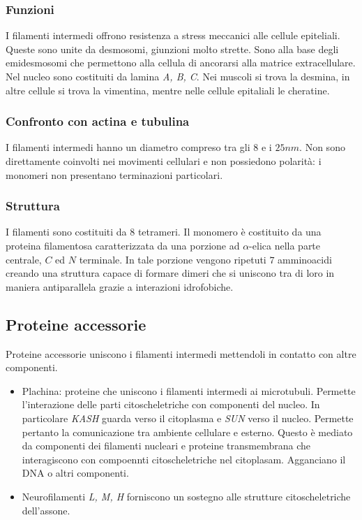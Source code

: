 		\subsubsection{Funzioni}
		I filamenti intermedi offrono resistenza a stress meccanici alle cellule epiteliali.
		Queste sono unite da desmosomi, giunzioni molto strette.
		Sono alla base degli emidesmosomi che permettono alla cellula di ancorarsi alla matrice extracellulare.
		Nel nucleo sono costituiti da lamina \emph{A, B, C}.
		Nei muscoli si trova la desmina, in altre cellule si trova la vimentina, mentre nelle cellule epitaliali le cheratine.

		\subsubsection{Confronto con actina e tubulina}
		I filamenti intermedi hanno un diametro compreso tra gli $8$ e i $25nm$.
		Non sono direttamente coinvolti nei movimenti cellulari e non possiedono polarit\`a: i monomeri non presentano terminazioni particolari.

		\subsubsection{Struttura}
		I filamenti sono costituiti da $8$ tetrameri.
		Il monomero \`e costituito da una proteina filamentosa caratterizzata da una porzione ad $\alpha$-elica nella parte centrale, $C$ ed $N$ terminale.
		In tale porzione vengono ripetuti $7$ amminoacidi creando una struttura capace di formare dimeri che si uniscono tra di loro in maniera antiparallela grazie a interazioni idrofobiche.

	\subsection{Proteine accessorie}
	Proteine accessorie uniscono i filamenti intermedi mettendoli in contatto con altre componenti.
	\begin{multicols}{2}
		\begin{itemize}
			\item Plachina: proteine che uniscono i filamenti intermedi ai microtubuli.
				Permette l'interazione delle parti citoscheletriche con componenti del nucleo.
				In particolare \emph{KASH} guarda verso il citoplasma e \emph{SUN} verso il nucleo.
				Permette pertanto la comunicazione tra ambiente cellulare e esterno.
				Questo \`e mediato da componenti dei filamenti nucleari e proteine transmembrana che interagiscono con compoennti citoscheletriche nel citoplasam.
				Agganciano il DNA o altri componenti.
			\item Neurofilamenti \emph{L, M, H} forniscono un sostegno alle strutture citoscheletriche dell'assone.
		\end{itemize}
	\end{multicols}

